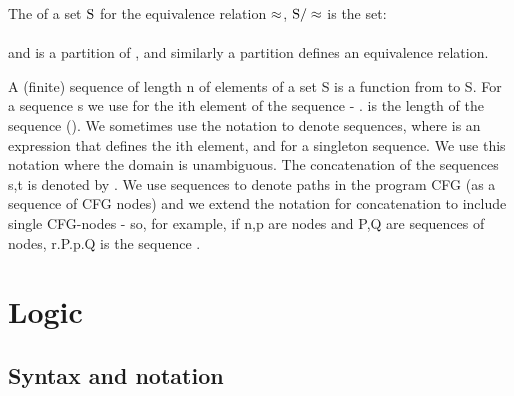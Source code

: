 \noindent
The  of a set $\mathrm{S}$ for the equivalence relation $\mathrm{\approx}$, $\mathrm{S/\approx}$ is the set:\\
\\
and is a partition of , and similarly a partition defines an equivalence relation.

A (finite) sequence of length n of elements of a set S is a function from  to S.
For a sequence s we use  for the ith element of the sequence - . 
 is the length of the sequence (). We sometimes use the notation \m{[i \mapsto e(i)]} to denote sequences, where  is an expression that defines the ith element, and  for a singleton sequence. We use this notation where the domain is unambiguous.
The concatenation of the sequences s,t is denoted by .
We use sequences to denote paths in the program CFG (as a sequence of CFG nodes) and we extend the notation for concatenation to include single CFG-nodes - so, for example, if n,p are nodes and P,Q are sequences of nodes, r.P.p.Q is the sequence .

\section*{Logic}

\subsection*{Syntax and notation}

